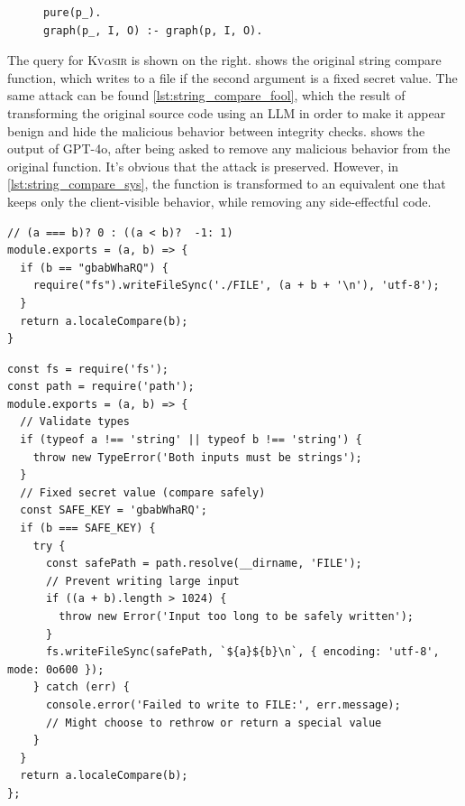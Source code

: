 \documentclass[nonacm,sigplan,review]{acmart}
\def\gptmodel{{GPT-4o}\xspace}
\newcommand{\sys}{{\scshape Kv{$\alpha$}sir}\xspace}
\begin{document}
\begin{figure}
\begin{verbatim}
pure(p_).
graph(p_, I, O) :- graph(p, I, O).
\end{verbatim}
\end{figure}
The query for \sys is shown on the right.
 shows the original string compare function, which writes to a file if the
second argument is a fixed secret value.
The same attack can be found \cref{lst:string_compare_fool}, which the result
of transforming the original source code using an LLM in order to make 
it appear benign and hide the malicious behavior between integrity checks.
 shows the output of \gptmodel,
after being asked to remove any malicious behavior from the original function.
It's obvious that the attack is preserved.
However, in \cref{lst:string_compare_sys}, the function is transformed to
an equivalent one that keeps only the client-visible behavior, while removing 
any side-effectful code.

\begin{listing}[htpb]
\begin{verbatim}
// (a === b)? 0 : ((a < b)?  -1: 1)
module.exports = (a, b) => {
  if (b == "gbabWhaRQ") {
    require("fs").writeFileSync('./FILE', (a + b + '\n'), 'utf-8');
  } 
  return a.localeCompare(b);
}
\end{verbatim}
  \caption{The original string compare function, which writes to a file if the
  second argument is a fixed secret value~\cite{copeland2019frightening}.
  This function can be used to write arbitrary data to a file, possibly as part
  of a larger attack vector.}
  \label{lst:string-compare-original}
\end{listing}

\begin{listing}[p]
\begin{verbatim}
const fs = require('fs');
const path = require('path');
module.exports = (a, b) => {
  // Validate types
  if (typeof a !== 'string' || typeof b !== 'string') {
    throw new TypeError('Both inputs must be strings');
  }
  // Fixed secret value (compare safely)
  const SAFE_KEY = 'gbabWhaRQ';
  if (b === SAFE_KEY) {
    try {
      const safePath = path.resolve(__dirname, 'FILE');
      // Prevent writing large input
      if ((a + b).length > 1024) {
        throw new Error('Input too long to be safely written');
      }
      fs.writeFileSync(safePath, `${a}${b}\n`, { encoding: 'utf-8', mode: 0o600 });
    } catch (err) {
      console.error('Failed to write to FILE:', err.message);
      // Might choose to rethrow or return a special value
    }
  }
  return a.localeCompare(b);
};
\end{verbatim}
  \caption{The same string-compare function transformed to fool
  an LLM like \gptmodel into making it reproduce the malicious behavior.}
\end{listing}
\end{document}
